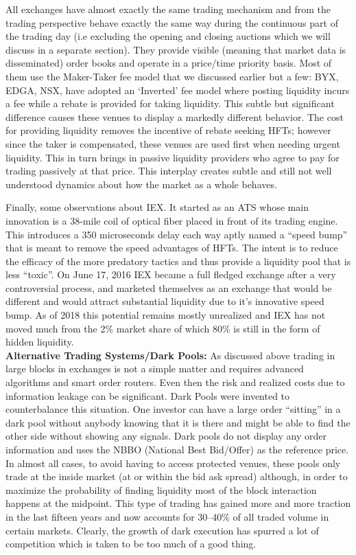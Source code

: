 All exchanges have almost exactly the same trading mechanism and from the trading perspective behave exactly the same way during the continuous part of the trading day (i.e excluding the opening and closing auctions which we will discuss in a separate section). They provide visible (meaning that market data is disseminated) order books and operate in a price/time priority basis. Most of them use the Maker-Taker fee model that we discussed earlier but a few: BYX, EDGA, NSX, have adopted an `Inverted' fee model where posting liquidity incurs a fee while a rebate is provided for taking liquidity. This subtle but significant difference causes these venues to display a markedly different behavior. The cost for providing liquidity removes the incentive of rebate seeking HFTs; however since the taker is compensated, these venues are used first when needing urgent liquidity. This in turn brings in passive liquidity providers who agree to pay for trading passively at that price. This interplay creates subtle and still not well understood dynamics about how the market as a whole behaves.


Finally, some observations about IEX. It started as an ATS whose main innovation is a 38-mile coil of optical fiber placed in front of its trading engine. This introduces a 350 microseconds delay each way aptly named a ``speed bump'' that is meant to remove the speed advantages of HFTs. The intent is to reduce the efficacy of the more predatory tactics and thus provide a liquidity pool that is less ``toxic''. On June 17, 2016 IEX became a full fledged exchange after a very controversial process, and marketed themselves as an exchange that would be different and would attract substantial liquidity due to it's innovative speed bump. As of 2018 this potential remains mostly unrealized and IEX has not moved much from the 2\% market share of which 80\% is still in the form of hidden liquidity. \\


\noindent\textbf{Alternative Trading Systems/Dark Pools:} As discussed above trading in large blocks in exchanges is not a simple matter and requires advanced algorithms and smart order routers. Even then the risk and realized costs due to information leakage can be significant. Dark Pools were invented to counterbalance this situation. One investor can have a large order ``sitting'' in a dark pool without anybody knowing that it is there and might be able to find the other side without showing any signals. Dark pools do not display any order information and uses the NBBO (National Best Bid/Offer) as the reference price. In almost all cases, to avoid having to access protected venues, these pools only trade at the inside market (at or within the bid ask spread) although, in order to maximize the probability of finding liquidity most of the block interaction happens at the midpoint. This type of trading has gained more and more traction in the last fifteen years and now accounts for 30--40\% of all traded volume in certain markets. Clearly, the growth of dark execution has spurred a lot of competition which is taken to be too much of a good thing. 


